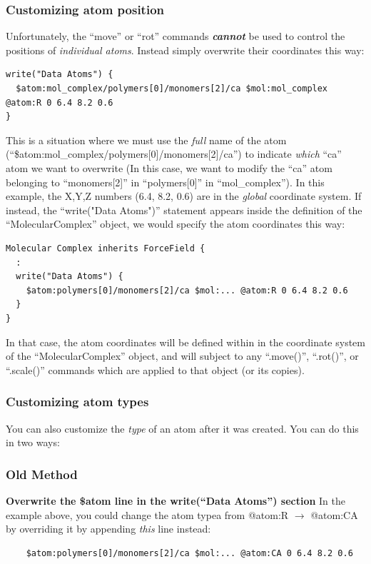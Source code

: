 \documentclass[11pt]{article}
\begin{document}
\subsubsection{Customizing atom position}
\label{sec:custom_atom_position}
Unfortunately, the ``move'' or ``rot'' commands \textbf{\textit{cannot}}
be used to control the positions of \textit{individual atoms}.
Instead simply overwrite their coordinates this way:
\begin{verbatim}
write("Data Atoms") {
  $atom:mol_complex/polymers[0]/monomers[2]/ca $mol:mol_complex @atom:R 0 6.4 8.2 0.6
}
\end{verbatim}
This is a situation where we must use the \textit{full} name of the atom
(``\$atom:mol\_complex/polymers[0]/monomers[2]/ca'')
to indicate \textit{which} ``ca'' atom we want to overwrite
(In this case, we want to modify the ``ca'' atom belonging to
``monomers[2]'' in ``polymers[0]'' in ``mol\_complex'').
In this example, the X,Y,Z numbers (6.4, 8.2, 0.6)
are in the \textit{global} coordinate system.
If instead, the ``write("Data Atoms")'' statement appears
inside the definition of the ``MolecularComplex'' object,
we would specify the atom coordinates this way:
\begin{verbatim}
Molecular Complex inherits ForceField {
  :
  write("Data Atoms") {
    $atom:polymers[0]/monomers[2]/ca $mol:... @atom:R 0 6.4 8.2 0.6
  }
}
\end{verbatim}
In that case, the atom coordinates will be defined
within in the coordinate system of the ``MolecularComplex'' object,
and will subject to any ``.move()'', ``.rot()'', or ``.scale()''
commands which are applied to that object (or its copies).

\subsubsection{Customizing atom types}
\label{sec:custom_atom_type}
You can also customize the \textit{type} of an atom after it was created.
You can do this in two ways:

\subsubsection*{Old Method}

\textbf{Overwrite the \$atom line in the write(``Data Atoms'') section}
In the example above, you could change the atom typea
from @atom:R $\rightarrow$ @atom:CA by overriding it by appending \textit{this}
line instead:
\begin{verbatim}
    $atom:polymers[0]/monomers[2]/ca $mol:... @atom:CA 0 6.4 8.2 0.6
\end{verbatim}
\end{document}
